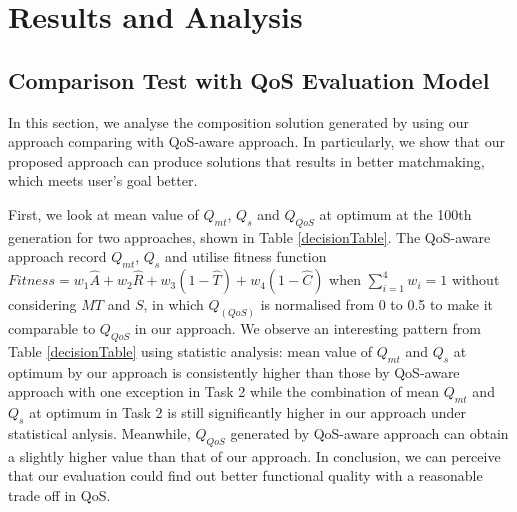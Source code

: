 \documentclass{IEEEtran}
\begin{document}
\section{Results and Analysis}\label{results_analysis}
\subsection{Comparison Test with QoS Evaluation Model}\label{comparisonTest}
In this section, we analyse the composition solution generated by using our approach comparing with QoS-aware approach. In particularly, we show that our proposed approach can produce solutions that results in better matchmaking, which meets user's goal better.
 
First, we look at mean value of $Q_{mt}$, $Q_{s}$ and $Q_{QoS}$ at optimum at the 100th generation for two approaches, shown in Table \ref{decisionTable}. The QoS-aware approach record $Q_{mt}$, $Q_{s}$ and utilise fitness function $Fitness = w_1 \hat{A} + w_2 \hat{R} + w_3(1 - \hat{T}) + w_4(1 - \hat{C})$ when $\sum_{i=1}^{4} w_i = 1$ without considering $MT$ and $S$, in which $Q_(QoS)$ is normalised from 0 to 0.5 to make it comparable to $Q_{QoS}$ in our approach. We observe an interesting pattern from Table \ref{decisionTable} using statistic analysis: mean value of $Q_{mt}$ and $Q_{s}$ at optimum by our approach is consistently higher than those by QoS-aware approach with one exception in Task 2 while the combination of mean $Q_{mt}$ and $Q_{s}$ at optimum in Task 2 is still significantly higher in our approach under statistical anlysis. Meanwhile, $Q_{QoS}$ generated by QoS-aware approach can obtain a slightly higher value than that of our approach. In conclusion, we can perceive that our evaluation could find out better functional quality with a reasonable trade off in QoS.
\end{document}
